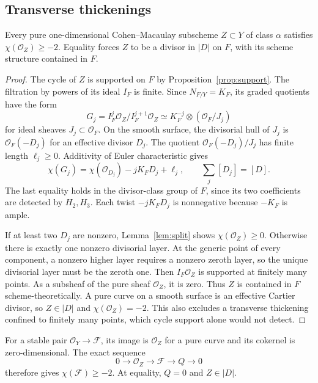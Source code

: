 \subsection{Transverse thickenings}
\begin{proposition}\label{prop:minimum}
Every pure one-dimensional Cohen--Macaulay subscheme $Z\subset Y$
of class $\alpha$ satisfies $\chi(\mathcal O_Z)\ge-2$.
Equality forces $Z$ to be a divisor in $|D|$ on $F$, with its
scheme structure contained in $F$.
\end{proposition}
\begin{proof}
The cycle of $Z$ is supported on $F$ by Proposition~\ref{prop:support}.
The filtration by powers of its ideal $I_F$ is finite. Since
$N_{F/Y}=K_F$, its graded quotients have the form
\begin{equation}\label{eq:layers}
 G_j=I_F^j\mathcal O_Z/I_F^{j+1}\mathcal O_Z
 \simeq K_F^{-j}\otimes(\mathcal O_F/J_j)
\end{equation}
for ideal sheaves $J_j\subset\mathcal O_F$. On the smooth surface,
the divisorial hull of $J_j$ is $\mathcal O_F(-D_j)$ for an
effective divisor $D_j$. The quotient
$\mathcal O_F(-D_j)/J_j$ has finite length $\ell_j\ge0$.
Additivity of Euler characteristic gives
\begin{equation}\label{eq:layer-chi}
 \chi(G_j)=\chi(\mathcal O_{D_j})-jK_FD_j+\ell_j,
 \qquad\sum_j[D_j]=[D].
\end{equation}
The last equality holds in the divisor-class group of $F$, since
its two coefficients are detected by $H_2,H_3$. Each twist
$-jK_FD_j$ is nonnegative because $-K_F$ is ample.

If at least two $D_j$ are nonzero, Lemma~\ref{lem:split} shows
$\chi(\mathcal O_Z)\ge0$. Otherwise there is exactly one
nonzero divisorial layer. At the generic point of every component,
a nonzero higher layer requires a nonzero zeroth layer, so the
unique divisorial layer must be the zeroth one. Then
$I_F\mathcal O_Z$ is supported at finitely many points.
As a subsheaf of the pure sheaf $\mathcal O_Z$, it is zero.
Thus $Z$ is contained in $F$ scheme-theoretically. A pure curve
on a smooth surface is an effective Cartier divisor, so
$Z\in|D|$ and $\chi(\mathcal O_Z)=-2$.
This also excludes a transverse thickening confined to finitely
many points, which cycle support alone would not detect.
\end{proof}

For a stable pair $\mathcal O_Y\to\mathcal F$, its image is
$\mathcal O_Z$ for a pure curve and its cokernel is
zero-dimensional. The exact sequence
\[
 0\longrightarrow\mathcal O_Z\longrightarrow\mathcal F
 \longrightarrow Q\longrightarrow0
\]
therefore gives $\chi(\mathcal F)\ge-2$. At equality,
$Q=0$ and $Z\in|D|$.

